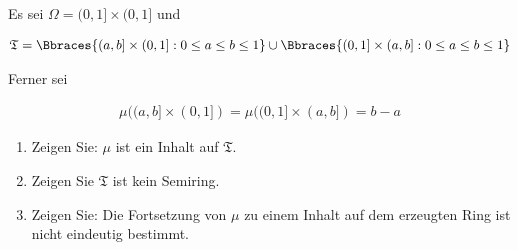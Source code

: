 
\begin{exercise}

Es sei $\Omega = (0, 1] \times (0, 1]$ und

\begin{align*}
  \mathfrak{T}
  =
  \Bbraces{(a, b] \times (0, 1]: 0 \leq a \leq b \leq 1}
  \cup
  \Bbraces{(0, 1] \times (a, b]: 0 \leq a \leq b \leq 1}
\end{align*}

Ferner sei

\begin{align*}
  \mu((a, b] \times (0, 1]) = \mu((0, 1] \times (a, b]) = b - a
\end{align*}

\begin{enumerate}[label = (\alph*)]

  \item
  Zeigen Sie: $\mu$ ist ein Inhalt auf $\mathfrak{T}$.
  
  \item
  Zeigen Sie $\mathfrak{T}$ ist kein Semiring.
  
  \item
  Zeigen Sie: Die Fortsetzung von $\mu$ zu einem Inhalt auf dem erzeugten Ring ist nicht eindeutig bestimmt.

\end{enumerate}

\end{exercise}


